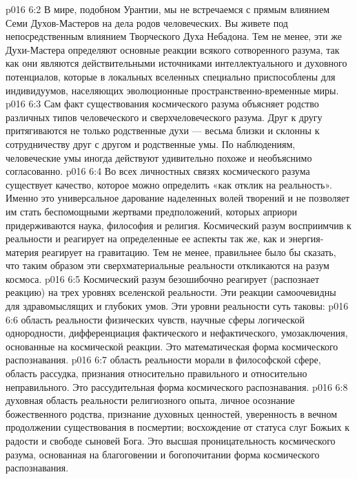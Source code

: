 \vs p016 6:2 В мире, подобном Урантии, мы не встречаемся с прямым влиянием Семи Духов\hyp{}Мастеров на дела родов человеческих. Вы живете под непосредственным влиянием Творческого Духа Небадона. Тем не менее, эти же Духи\hyp{}Мастера определяют основные реакции всякого сотворенного разума, так как они являются действительными источниками интеллектуального и духовного потенциалов, которые в локальных вселенных специально приспособлены для индивидуумов, населяющих эволюционные пространственно\hyp{}временные миры.
\vs p016 6:3 Сам факт существования космического разума объясняет родство различных типов человеческого и сверхчеловеческого разума. Друг к другу притягиваются не только родственные духи --- весьма близки и склонны к сотрудничеству друг с другом и родственные умы. По наблюдениям, человеческие умы иногда действуют удивительно похоже и необъяснимо согласованно.
\vs p016 6:4 \pc Во всех личностных связях космического разума существует качество, которое можно определить «как отклик на реальность». Именно это универсальное дарование наделенных волей творений и не позволяет им стать беспомощными жертвами предположений, которых априори придерживаются наука, философия и религия. Космический разум восприимчив к реальности и реагирует на определенные ее аспекты так же, как и энергия\hyp{}материя реагирует на гравитацию. Тем не менее, правильнее было бы сказать, что таким образом эти сверхматериальные реальности откликаются на разум космоса.
\vs p016 6:5 Космический разум безошибочно реагирует (распознает реакцию) на трех уровнях вселенской реальности. Эти реакции самоочевидны для здравомыслящих и глубоких умов. Эти уровни реальности суть таковы:
\vs p016 6:6 \bibnobreakspace {} область реальности физических чувств, научные сферы логической однородности, дифференциация фактического и нефактического, умозаключения, основанные на космической реакции. Это математическая форма космического распознавания.
\vs p016 6:7 \pc {}\bibnobreakspace {} область реальности морали в философской сфере, область рассудка, признания относительно правильного и относительно неправильного. Это рассудительная форма космического распознавания.
\vs p016 6:8 \pc {}\bibnobreakspace {} духовная область реальности религиозного опыта, личное осознание божественного родства, признание духовных ценностей, уверенность в вечном продолжении существования в посмертии; восхождение от статуса слуг Божьих к радости и свободе сыновей Бога. Это высшая проницательность космического разума, основанная на благоговении и богопочитании форма космического распознавания.

